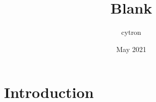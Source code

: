 \documentclass{article}
\title{Blank}
\author{cytron }
\date{May 2021}
\begin{document}
\maketitle

\section{Introduction}
\end{document}

